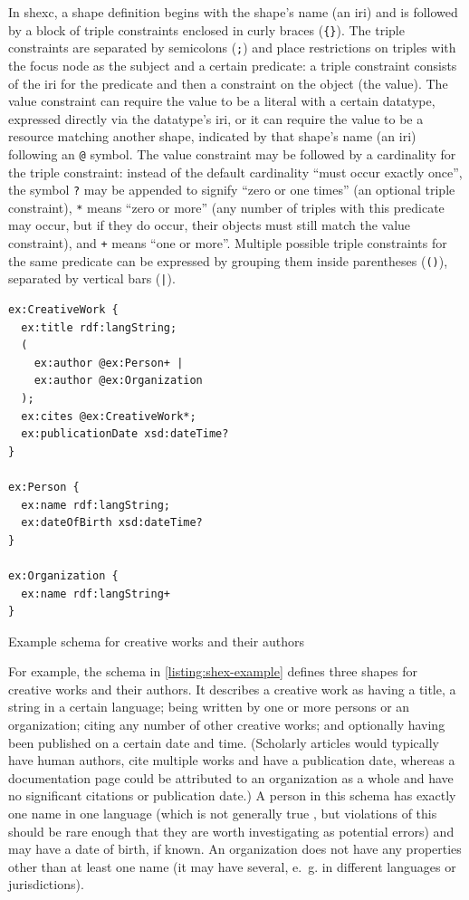 In \gls{shexc}, a \gls{shape} definition begins with the \gls{shape}’s name (an \gls{iri})
and is followed by a block of \glspl{triple constraint} enclosed in curly braces (\lstinline!{}!).
The \glspl{triple constraint} are separated by semicolons (\lstinline{;})
and place restrictions on \glspl{triple} with the \gls{focus node} as the \gls{subject} and a certain \gls{predicate}:
a \gls{triple constraint} consists of the \gls{iri} for the \gls{predicate} and then a constraint on the \gls{object} (the value).
The value constraint can require the value to be a literal with a certain datatype,
expressed directly via the datatype’s \gls{iri},
or it can require the value to be a \gls{resource} matching another \gls{shape},
indicated by that \gls{shape}’s name (an \gls{iri}) following an \lstinline{@} symbol.
The value constraint may be followed by a cardinality for the \gls{triple constraint}:
instead of the default cardinality “must occur exactly once”,
the symbol \lstinline{?} may be appended to signify “zero or one times”
(an optional \gls{triple constraint}),
\lstinline{*} means “zero or more”
(any number of \glspl{triple} with this \gls{predicate} may occur,
but if they do occur, their \glspl{object} must still match the \gls{value constraint}),
and \lstinline{+} means “one or more”.
Multiple possible \glspl{triple constraint} for the same \gls{predicate} can be expressed
by grouping them inside parentheses (\lstinline{()}), separated by vertical bars (\lstinline{|}).

\begin{listing}
\begin{lstlisting}[language=sparql]
ex:CreativeWork {
  ex:title rdf:langString;
  (
    ex:author @ex:Person+ |
    ex:author @ex:Organization
  );
  ex:cites @ex:CreativeWork*;
  ex:publicationDate xsd:dateTime?
}

ex:Person {
  ex:name rdf:langString;
  ex:dateOfBirth xsd:dateTime?
}

ex:Organization {
  ex:name rdf:langString+
}
\end{lstlisting}
\caption{Example \gls{schema} for creative works and their authors}
\label{listing:shex-example}
\end{listing}

For example, the schema in \cref{listing:shex-example} defines three \glspl{shape}
for creative works and their authors.
It describes a creative work as having a title, a string in a certain language;
being written by one or more persons or an organization;
citing any number of other creative works;
and optionally having been published on a certain date and time.
(Scholarly articles would typically have human authors,
cite multiple works and have a publication date,
whereas a documentation page could be attributed to an organization as a whole
and have no significant citations or publication date.)
A person in this \gls{schema} has exactly one name in one language
(which is not generally true \cite{falsehoods-programmers-believe-about-names},
but violations of this should be rare enough
that they are worth investigating as potential errors)
and may have a date of birth, if known.
An organization does not have any properties other than at least one name
(it may have several, e.~g. in different languages or jurisdictions).

